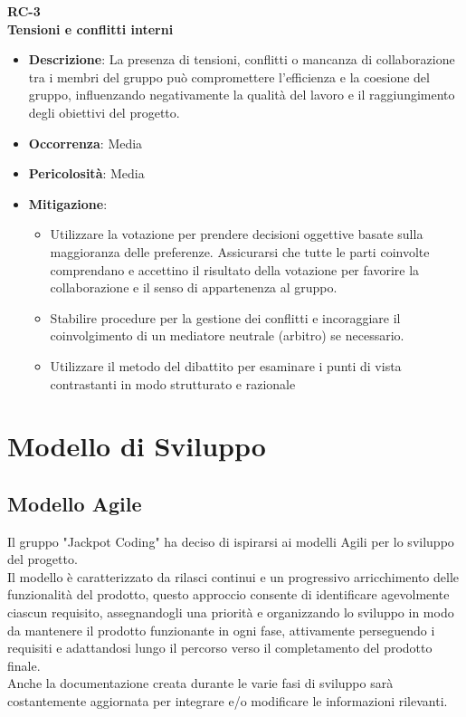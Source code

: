 \documentclass[5pt]{article}
\begin{document}
\textbf{RC-3}\\
\textbf{Tensioni e conflitti interni}
\begin{itemize}
  \item \textbf{Descrizione}: La presenza di tensioni, conflitti o mancanza di collaborazione tra i membri del gruppo può compromettere l'efficienza e la coesione del gruppo, influenzando negativamente la qualità del lavoro e il raggiungimento degli obiettivi del progetto.
  \item \textbf{Occorrenza}: Media
  \item \textbf{Pericolosità}: Media
  \item \textbf{Mitigazione}: 
    \begin{itemize}
      \item Utilizzare la votazione per prendere decisioni oggettive basate sulla maggioranza delle preferenze. Assicurarsi che tutte le parti coinvolte comprendano e accettino il risultato della votazione per favorire la collaborazione e il senso di appartenenza al gruppo.
      \item Stabilire procedure per la gestione dei conflitti e incoraggiare il coinvolgimento di un mediatore neutrale (arbitro) se necessario.
      \item Utilizzare il metodo del dibattito per esaminare i punti di vista contrastanti in modo strutturato e razionale
    \end{itemize}
\end{itemize}

\section{Modello di Sviluppo}
\subsection{Modello Agile}
Il gruppo "Jackpot Coding" ha deciso di ispirarsi ai modelli Agili per lo sviluppo del progetto.\\
Il modello è caratterizzato da rilasci continui e un progressivo arricchimento delle funzionalità del prodotto, questo approccio consente di identificare agevolmente ciascun requisito, assegnandogli una priorità e organizzando lo sviluppo in modo da mantenere il prodotto funzionante in ogni fase, attivamente perseguendo i requisiti e adattandosi lungo il percorso verso il completamento del prodotto finale.\\
Anche la documentazione creata durante le varie fasi di sviluppo sarà costantemente aggiornata per integrare e/o modificare le informazioni rilevanti.
\end{document}
